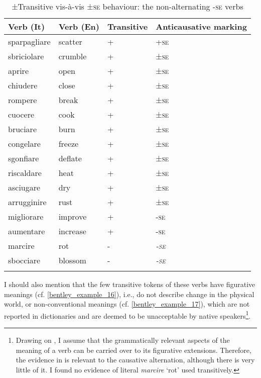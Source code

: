 \documentclass[output=paper,colorlinks,citecolor=brown
]{langscibook}
\begin{document}
\begin{table}[hbt!]
\caption{±Transitive vis-à-vis ±\textsc{se} behaviour: the non-alternating -\textsc{se} verbs}
\label{tab:bentley_table_4}\begin{tabular}{llll}
\lsptoprule
Verb (It)    & Verb (En) & Transitive & Anticausative marking \\
\midrule
sparpagliare & scatter   & +          & +\textsc{se}                  \\
sbriciolare  & crumble   & +          & ±\textsc{se}                  \\
aprire       & open      & +          & ±\textsc{se}                  \\
chiudere     & close     & +          & ±\textsc{se}                  \\
rompere      & break     & +          & ±\textsc{se}                  \\
cuocere      & cook      & +          & ±\textsc{se}                  \\
bruciare     & burn      & +          & ±\textsc{se}                  \\
congelare    & freeze    & +          & ±\textsc{se}                  \\
sgonfiare    & deflate   & +          & ±\textsc{se}                  \\
riscaldare   & heat      & +          & ±\textsc{se}                  \\
asciugare    & dry       & +          & ±\textsc{se}                  \\
arrugginire  & rust      & +          & ±\textsc{se}                  \\
migliorare   & improve   & +          & -\textsc{se}                  \\
aumentare    & increase  & +          & -\textsc{se}                  \\
marcire      & rot       & -          & \textit{-\textsc{se}}          \\
sbocciare    & blossom   & -          & \textit{-\textsc{se}}           \\
\lspbottomrule
\end{tabular}
\end{table}

I should also mention that the few transitive tokens of these verbs have figurative meanings (cf. \ref{bentley_example_16}), i.e., do not describe change in the physical world, or non-conventional meanings (cf. \ref{bentley_example_17}), which are not reported in dictionaries and are deemed to be unacceptable by native speakers\footnote{Drawing on \citet{mcnally2022grammatically}, I assume that the grammatically relevant aspects of the meaning of a verb can be carried over to its figurative extensions. Therefore, the evidence in  is relevant to the causative alternation, although there is very little of it. I found no evidence of literal \textit{marcire} ‘rot’ used transitively.}.
\end{document}
